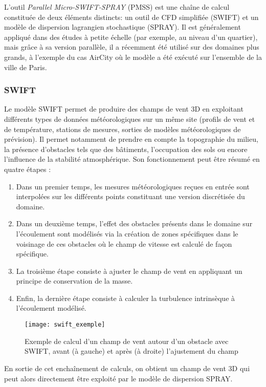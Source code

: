 L'outil \textit{Parallel Micro-SWIFT-SPRAY} (PMSS) est une chaîne de calcul constituée de deux éléments distincts: un outil de CFD simplifiée (SWIFT) et un modèle de dispersion lagrangien stochastique (SPRAY). Il est généralement appliqué dans des études à petite échelle (par exemple, au niveau d'un quartier), mais grâce à sa version parallèle, il a récemment été utilisé sur des domaines plus grands, à l'exemple du cas AirCity \cite{Moussafir2014} où le modèle a été exécuté sur l'ensemble de la ville de Paris.\\

\subsubsection{SWIFT}

Le modèle SWIFT permet de produire des champs de vent 3D en exploitant différents types de données météorologiques sur un même site (profils de vent et de température, stations de mesures, sorties de modèles météorologiques de prévision). Il permet notamment de prendre en compte la topographie du milieu, la présence d'obstacles tels que des bâtiments, l'occupation des sols ou encore l'influence de la stabilité atmosphérique. Son fonctionnement peut être résumé en quatre étapes :  \\

\begin{enumerate}
	\item Dans un premier temps, les mesures météorologiques reçues en entrée sont interpolées sur les différents points constituant une version discrétisée du domaine.
	\item Dans un deuxième temps, l'effet des obstacles présents dans le domaine sur l'écoulement sont modélisés via la création de zones spécifiques dans le voisinage de ces obstacles où le champ de vitesse est calculé de façon spécifique.
	\item La troisième étape consiste à ajuster le champ de vent en appliquant un principe de conservation de la masse.
	\item Enfin, la dernière étape consiste à calculer la turbulence intrinsèque à l'écoulement modélisé.\\
\end{enumerate}

\begin{figure}[h!]
	\centering
	\texttt{[image: swift\_exemple]}
	\caption{Exemple de calcul d'un champ de vent autour d'un obstacle avec SWIFT, avant (à gauche) et après (à droite) l'ajustement du champ}
	\label{fig_swift_exemple}
\end{figure}
En sortie de cet enchaînement de calculs, on obtient un champ de vent 3D qui peut alors directement être exploité par le modèle de dispersion SPRAY.



